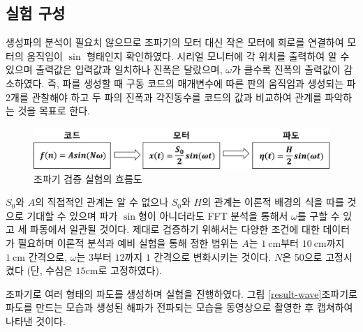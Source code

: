 \subsection{실험 구성}
생성파의 분석이 필요치 않으므로 조파기의 모터 대신 작은 모터에 회로를 연결하여 모터의 움직임이 $\sin$ 형태인지 확인하였다. 시리얼 모니터에 각 위치를 출력하여 알 수 있으며 출력값은 입력값과 일치하나 진폭은 달랐으며, $\omega$가 클수록 진폭의 출력값이 감소하였다. 즉, 파를 생성할 때 구동 코드의 매개변수에 따른 판의 움직임과 생성되는 파 2개를 관찰해야 하고 두 파의 진폭과 각진동수를 코드의 값과 비교하여 관계를 파악하는 것을 목표로 한다.

\begin{figure}[H]
    \centering
    \includegraphics[width=12cm]{images/Flow_Chart(Analysis System_Kor).jpg}
    \caption{조파기 검증 실험의 흐름도}
    \label{Flow_Chart}
\end{figure}

$S_0$와 $A$의 직접적인 관계는 알 수 없으나 $S_0$와 $H$의 관계는 이론적 배경의 식을 따를 것으로 기대할 수 있으며 파가 $\sin$형이 아니더라도 FFT 분석을 통해서 $\omega$를 구할 수 있고 세 파동에서 일관될 것이다. 제대로 검증하기 위해서는 다양한 조건에 대한 데이터가 필요하며 이론적 분석과 예비 실험을 통해 정한 범위는 $A$는 $1\mathrm{~cm}$부터 $10\mathrm{~cm}$까지 $1\mathrm{~cm}$ 간격으로, $\omega$는 $3$부터 $12$까지 $1$ 간격으로 변화시키는 것이다. $N$은 50으로 고정시켰다 (단, 수심은 $15\mathrm{cm}$로 고정하였다).



조파기로 여러 형태의 파도를 생성하며 실험을 진행하였다. 그림 \ref{result-wave}\는 조파기로 파도를 만드는 모습과 생성된 해파가 전파되는 모습을 동영상으로 촬영한 후 캡쳐하여 나타낸 것이다. 

